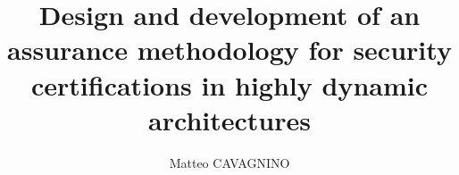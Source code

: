 \documentclass[a4paper, 12pt]{report}
\theoremstyle{definition}
\begin{document}
\title{Design and development of an assurance methodology for security certifications in highly dynamic architectures}
\author{Matteo CAVAGNINO}
%
% 
\beforepreface %
%
% 
%

%
%
\end{document}
